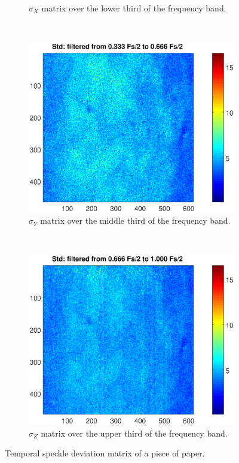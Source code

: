 \documentclass[review]{elsarticle}
\begin{document}
\begin{figure}[h!]
\begin{subfigure}[b]{0.465\textwidth}
	\caption{$\sigma_X$ matrix over the lower third of the frequency band.}
        \label{fig:papelstd_stdx}
    \end{subfigure}
    ~\\ 
    \begin{subfigure}[b]{0.475\textwidth}
        \includegraphics[width=\textwidth]{stdy.eps}
	\caption{$\sigma_Y$ matrix over the middle third of the frequency band.}
        \label{fig:papelstd_stdy}
    \end{subfigure}
  ~
    \begin{subfigure}[b]{0.475\textwidth}
        \includegraphics[width=\textwidth]{stdz.eps}
	\caption{$\sigma_Z$ matrix over the upper third of the frequency band.}
        \label{fig:papelstd_stdz}
    \end{subfigure}
    
    \caption{Temporal speckle deviation matrix of a piece of paper.}
    \label{fig:papelstd}
\end{figure}
\end{document}
